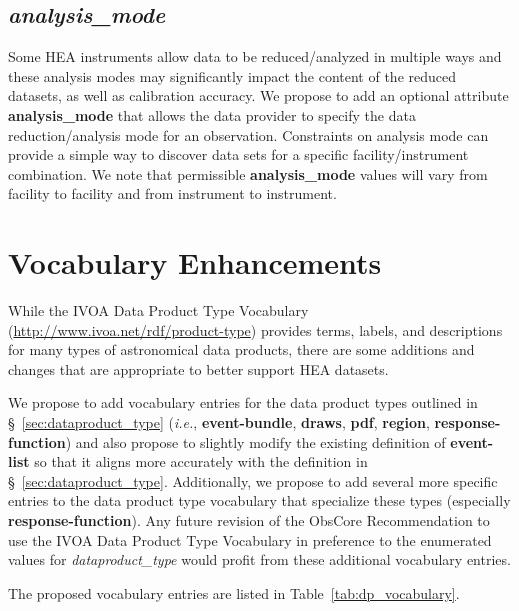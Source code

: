 \documentclass[11pt,a4paper]{ivoa}
\begin{document}
\subsection{{\em analysis\_mode}}

Some HEA instruments allow data to be reduced/analyzed in multiple ways and these analysis modes may significantly impact the content of the reduced datasets, as well as calibration accuracy.  We propose to add an optional attribute {\bf analysis\_mode} that allows the data provider to specify the data reduction/analysis mode for an observation.  Constraints on analysis mode can provide a simple way to discover data sets for a specific facility/instrument combination.  We note that permissible {\bf analysis\_mode} values will vary from facility to facility and from instrument to instrument.

\section{Vocabulary Enhancements}

While the IVOA Data Product Type Vocabulary (\url{http://www.ivoa.net/rdf/product-type}) provides terms, labels, and descriptions for many types of astronomical data products, there are some additions and changes that are appropriate to better support HEA datasets.  

We propose to add vocabulary entries for the data product types outlined in \S~\ref{sec:dataproduct_type} ({\em i.e.\/}, {\bf event-bundle}, {\bf draws}, {\bf pdf}, {\bf region}, {\bf response-function}) and also propose to slightly modify the existing definition of {\bf event-list} so that it aligns more accurately with the definition in \S~\ref{sec:dataproduct_type}.  Additionally, we propose to add several more specific entries to the data product type vocabulary that specialize these types (especially {\bf response-function}).  Any future revision of the ObsCore Recommendation to use the IVOA Data Product Type Vocabulary in preference to the enumerated values for {\em dataproduct\_type\/} would profit from these additional vocabulary entries.

The proposed vocabulary entries are listed in Table~\ref{tab:dp_vocabulary}.
\end{document}
